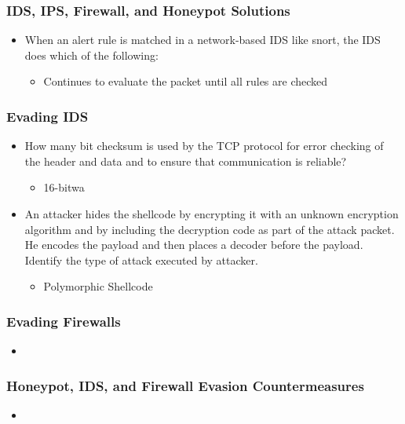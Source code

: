 \subsubsection{IDS, IPS, Firewall, and Honeypot Solutions}
\begin{itemize}
    \item When an alert rule is matched in a network-based IDS like snort, the IDS does which of the following:
    \begin{itemize}
        \item   Continues to evaluate the packet until all rules are checked
    \end{itemize}
\end{itemize}
\subsubsection{Evading IDS}
\begin{itemize}
    \item How many bit checksum is used by the TCP protocol for error checking of the header and data and to ensure that communication is reliable?
    \begin{itemize}
        \item  16-bitwa
    \end{itemize}
    \item An attacker hides the shellcode by encrypting it with an unknown encryption algorithm and by including the decryption code as part of the attack packet. He encodes the payload and then places a decoder before the payload. Identify the type of attack executed by attacker.
    \begin{itemize}
        \item Polymorphic Shellcode
    \end{itemize}
\end{itemize}
\subsubsection{Evading Firewalls}
\begin{itemize}
    \item 
\end{itemize}
\subsubsection{Honeypot, IDS, and Firewall Evasion Countermeasures}
\begin{itemize}
    \item 
\end{itemize}



